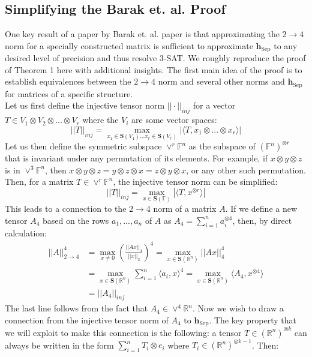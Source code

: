 \documentclass[10pt]{article}
\newcommand{\Sep}{\textrm{Sep}}
\newcommand{\mbf}[1]{\mathbf{ #1 }}
\begin{document}
 

\subsection{Simplifying the Barak et. al. Proof}
One key result of a paper by Barak et. al. paper \cite{Barak} is that approximating the $2 \to 4$ norm for a specially constructed matrix is sufficient to approximate $\mbf{h}_{\Sep}$ to any desired level of precision and thus resolve 3-SAT. We roughly reproduce the proof of Theorem 1 here with additional insights. The first main idea of the proof is to establish equivalences between the $2 \to 4$ norm and several other norms and $\mbf{h}_{\Sep}$ for matrices of a specific structure. \\
Let us first define the injective tensor norm $||\cdot ||_{inj}$ for a vector $T \in V_1 \otimes V_2 \otimes ... \otimes V_r$ where the $V_i$ are some vector spaces:
$$||T||_{inj} = \max_{x_1 \in \mbf{S}(V_1) ... x_r \in \mbf{S}(V_r)} |\langle T, x_1 \otimes ... \otimes x_r\rangle |$$ 
Let us then define the symmetric subspace $\vee^r\mathbb{F}^n$ as the subspace of $(\mathbb{F}^n)^{\otimes r}$ that is invariant under any permutation of its elements. For example, if $x \otimes y \otimes z$ is in $\vee^3\mathbb{F}^n$, then $x \otimes y \otimes z = y \otimes z \otimes x = z \otimes y \otimes x$, or any other such permutation. Then, for a matrix $T \in \vee^r\mathbb{F}^n$, the injective tensor norm can be simplified:
$$||T||_{inj} = \max_{x \in \mbf{S}(\mathbb{F})}|\langle T, x^{\otimes r} \rangle |$$
This leads to a connection to the $2 \to 4$ norm of a matrix $A$. If we define a new tensor $A_4$ based on the rows $a_1, ..., a_n$ of $A$ as $A_4 = \sum_{i=1}^n a_i^{\otimes 4}$, then, by direct calculation:
\begin{align}
    ||A||_{2 \to 4}^4 &= \max_{x \neq 0} \left(\frac{||Ax||_4}{||x||_2}\right)^4 = \max_{x \in \mbf{S}(\mathbb{R}^n)} ||Ax||_4^4 \nonumber\\
    &= \max_{x \in \mbf{S}(\mathbb{R}^n)} \sum_{i=1}^n \langle a_i, x \rangle^4 = \max_{x \in \mbf{S}(\mathbb{R}^n)} \langle A_4, x^{\otimes 4}\rangle \nonumber\\
    &= ||A_4||_{inj} \nonumber
\end{align}
The last line follows from the fact that $A_4 \in \vee^4\mathbb{R}^n$. Now we wish to draw a connection from the injective tensor norm of $A_4$ to $\mbf{h}_{\Sep}$. The key property that we will exploit to make this connection is the following: a tensor $T \in (\mathbb{R}^n)^{\otimes k}$ can always be written in the form $\sum_{i=1}^nT_i \otimes e_i$ where $T_i \in (\mathbb{R}^n)^{\otimes k-1}$. Then:
\end{document}
